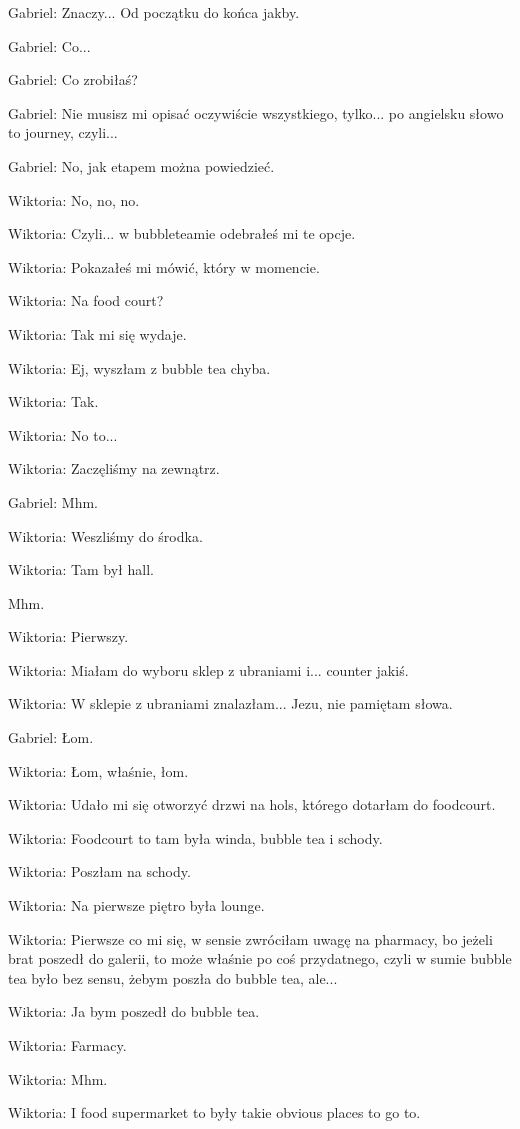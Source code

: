 Gabriel: Znaczy... Od początku do końca jakby.

Gabriel: Co...

Gabriel: Co zrobiłaś?

Gabriel: Nie musisz mi opisać oczywiście wszystkiego, tylko... po angielsku słowo to journey, czyli...

Gabriel: No, jak etapem można powiedzieć.

Wiktoria: No, no, no.

Wiktoria: Czyli... w bubbleteamie odebrałeś mi te opcje.

Wiktoria: Pokazałeś mi mówić, który w momencie.

Wiktoria: Na food court?

Wiktoria: Tak mi się wydaje.

Wiktoria: Ej, wyszłam z bubble tea chyba.

Wiktoria: Tak.

Wiktoria: No to...

Wiktoria: Zaczęliśmy na zewnątrz.

Gabriel: Mhm.

Wiktoria: Weszliśmy do środka.

Wiktoria: Tam był hall.

Mhm.

Wiktoria: Pierwszy.

Wiktoria: Miałam do wyboru sklep z ubraniami i... counter jakiś.

Wiktoria: W sklepie z ubraniami znalazłam... Jezu, nie pamiętam słowa.

Gabriel: Łom.

Wiktoria: Łom, właśnie, łom.

Wiktoria: Udało mi się otworzyć drzwi na hols, którego dotarłam do foodcourt.

Wiktoria: Foodcourt to tam była winda, bubble tea i schody.

Wiktoria: Poszłam na schody.

Wiktoria: Na pierwsze piętro była lounge.

Wiktoria: Pierwsze co mi się, w sensie zwróciłam uwagę na pharmacy, bo jeżeli brat poszedł do galerii, to może właśnie po coś przydatnego, czyli w sumie bubble tea było bez sensu, żebym poszła do bubble tea, ale...

Wiktoria: Ja bym poszedł do bubble tea.

Wiktoria: Farmacy.

Wiktoria: Mhm.

Wiktoria: I food supermarket to były takie obvious places to go to.

